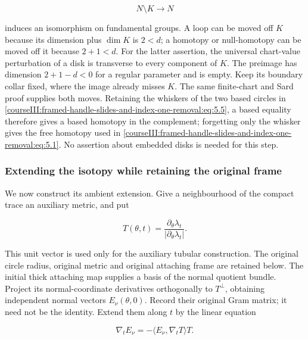 \begin{equation}
N\setminus K\longrightarrow N
 \label{courseIII:framed-handle-slides-and-index-one-removal:eq:5.5}
\end{equation}

induces an isomorphism on fundamental groups. A loop can be moved off \(K\) because its dimension plus \(\dim K\) is \(2<d\); a homotopy or null-homotopy can be moved off it because \(2+1<d\). For the latter assertion, the universal chart-value perturbation of a disk is transverse to every component of \(K\). The preimage has dimension \(2+1-d<0\) for a regular parameter and is empty. Keep its boundary collar fixed, where the image already misses \(K\). The same finite-chart and Sard proof supplies both moves. Retaining the whiskers of the two based circles in \eqref{courseIII:framed-handle-slides-and-index-one-removal:eq:5.5}, a based equality therefore gives a based homotopy in the complement; forgetting only the whisker gives the free homotopy used in \eqref{courseIII:framed-handle-slides-and-index-one-removal:eq:5.1}. No assertion about embedded disks is needed for this step.

\subsubsection{Extending the isotopy while retaining the original frame}
\label{courseIII:framed-handle-slides-and-index-one-removal:section-5.1}

We now construct its ambient extension. Give a neighbourhood of the compact trace an auxiliary metric, and put

\begin{equation}
T(\theta,t)
   =\frac{\partial_\theta\lambda_t}
          {|\partial_\theta\lambda_t|}.
 \label{courseIII:framed-handle-slides-and-index-one-removal:eq:5.6}
\end{equation}

This unit vector is used only for the auxiliary tubular construction. The original circle radius, original metric and original attaching frame are retained below. The initial thick attaching map supplies a basis of the normal quotient bundle. Project its normal-coordinate derivatives orthogonally to \(T^\perp\), obtaining independent normal vectors \(E_\nu(\theta,0)\). Record their original Gram matrix; it need not be the identity. Extend them along \(t\) by the linear equation

\begin{equation}
\nabla_t E_\nu
   =-\langle E_\nu,\nabla_tT\rangle T .
 \label{courseIII:framed-handle-slides-and-index-one-removal:eq:5.7}
\end{equation}

